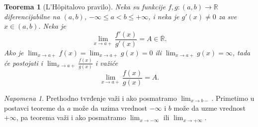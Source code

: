 \documentclass[a4paper,12pt]{article}
\theoremstyle{plain}
\newtheorem{theorem}{Teorema}[section]
\theoremstyle{definition}
\theoremstyle{remark}
\newtheorem*{remark}{Napomena}
\begin{document}
\begin{theorem}[L'Hôpitalovo pravilo]
Neka su funkcije $f, g: (a, b) \to \mathbb{R}$ diferencijabilne na $(a, b)$, $-\infty \leq a < b \leq +\infty$, i neka je $g'(x) \neq 0$ za sve $x \in (a, b)$. Neka je
$$
\lim_{x \to a+} \frac{f'(x)}{g'(x)} = A \in \overline{\mathbb{R}}.
$$
Ako je $\lim_{x \to a+} f(x) = \lim_{x \to a+} g(x) = 0$ ili $\lim_{x \to a+} g(x) = \infty$, tada će postojati i $\lim_{x \to a+} \frac{f(x)}{g(x)}$ i važiće
$$
\lim_{x \to a+} \frac{f(x)}{g(x)} = A.
$$
\end{theorem}

\begin{remark}
Prethodno tvrđenje važi i ako posmatramo $\lim_{x \to b-}$. Primetimo u postavci teoreme da $a$ može da uzima vrednost $-\infty$ i $b$ može da uzme vrednost $+\infty$, pa teorema važi i ako posmatramo $\lim_{x \to -\infty}$ ili $\lim_{x \to +\infty}$.
\end{remark}
\end{document}

